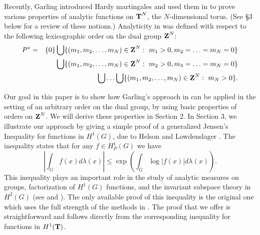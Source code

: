 Recently,
Garling \cite{gar2} introduced Hardy martingales
and used them in \cite{gar} to prove various properties of 
analytic functions on $\T ^N$, the $N$-dimensional torus.
(See \S 3 below for a review of these notions.)
Analyticity in
\cite{gar} was defined with respect to the following 
 lexicographic order on the
dual group $\Z^N$:
\newpage
\begin{eqnarray*}
P^*	&=&	\{0\}
	\bigcup \{(m_1,m_2,\ldots,m_N)\in \Z^N:\ m_1>0,
	m_2=\ldots=m_N=0\}\\
	& &	\bigcup \{(m_1,m_2,\ldots,m_N)\in
	 \Z^N: \ m_2>0,m_3=\ldots=m_N=0\}\\
	 &&
	   \bigcup 
	 \ldots \bigcup 
		\{(m_1,m_2,\ldots,m_N)\in \Z^N:\ m_N>0\}.
\end{eqnarray*} 

Our goal in this paper is to show how Garling's approach in 
\cite{gar} can be applied in the setting of an arbitrary order
on the dual group, by using basic properties of 
orders on $\Z^N$.  We will derive these properties in Section 2.
In Section 3, we illustrate
our approach by giving a simple proof of a generalized 
Jensen's Inequality for functions
in $H^1(G)$, due to Helson and Lowdenslager \cite{hl1}.
The inequality states that for any $f\in H^1_P(G)$ we have
\begin{equation}
\left|\int_Gf(x)d\lambda(x)\right|\leq \exp \left( 
\int_G\log |f(x)|d\lambda (x)\right).
\label{jensen}
\end{equation}
This inequality plays an important role in the 
study of analytic measures
on groups, factorization of $H^1(G)$ functions, and 
the invariant subspace theory in $H^2(G)$ (see \cite{hl1} and 
\cite{hl2}).  
The only available proof
of this inequality is the original one
which uses the full strength of the methods in \cite{hl1}.  
The proof that we offer is straightforward
and follows directly from the corresponding inequality for functions
in $H^1(\T)$.


